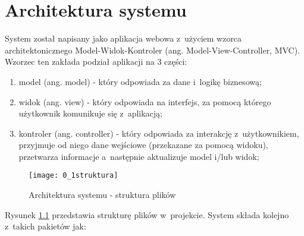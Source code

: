 \chapter{Architektura systemu}

System został napisany jako aplikacja webowa z~użyciem wzorca architektonicznego Model-Widok-Kontroler (ang. Model-View-Controller, MVC). Wzorzec ten zakłada podział aplikacji na 3 części:

\begin{enumerate}
\item model (ang. model) - który odpowiada za dane i~logikę biznesową;
\item widok (ang. view) - który odpowiada na interfejs, za pomocą którego użytkownik komunikuje się z~aplikacją;
\item kontroler (ang. controller) - który odpowiada za interakcję z~użytkownikiem, przyjmuje od niego dane wejściowe (przekazane za pomocą widoku), przetwarza informacje a~następnie aktualizuje model i/lub widok;
\end{enumerate}

\begin{figure}[!h]
\centering
    \texttt{[image: 0\_1struktura]}
    \caption{Architektura systemu - struktura plików}
    \label{obr01}
\end{figure}

\clearpage
Rysunek \ref{obr01} przedstawia strukturę plików w~projekcie. System składa kolejno z~takich pakietów jak:

